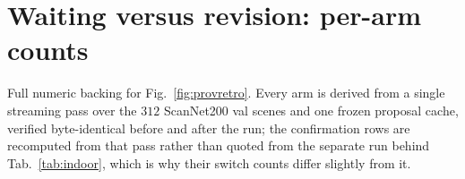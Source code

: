 \begin{table}[h]
\centering\footnotesize
\setlength{\tabcolsep}{3pt}
\caption{\textbf{Robustness of the consumer result.} Each entry is the
per-scene mean miss rate of causal emission under the confirmation test minus
that of ours (provisional, $H{=}4$), in percentage points, with a $95\%$
scene-bootstrap interval; Scenes counts those containing at least one critical
object. Each row below the first changes one setting of the main-text
comparison. ``First-frame objects excluded'' drops objects already visible at a
scene's first frame, which no confirming arm can hold at that frame. The
critical set contains $2{,}656$, $5{,}487$ and $7{,}302$ objects at $R{=}10$,
$20$ and $30$\,m.}
\label{tab:consumer-robust}
\end{table}

\section{Waiting versus revision: per-arm counts}
\label{supp:provretro}
Full numeric backing for Fig.~\ref{fig:provretro}. Every arm is derived from a
single streaming pass over the $312$ ScanNet200 val scenes and one frozen
proposal cache, verified byte-identical before and after the run; the
confirmation rows are recomputed from that pass rather than quoted from the
separate run behind Tab.~\ref{tab:indoor}, which is why their switch counts
differ slightly from it.

